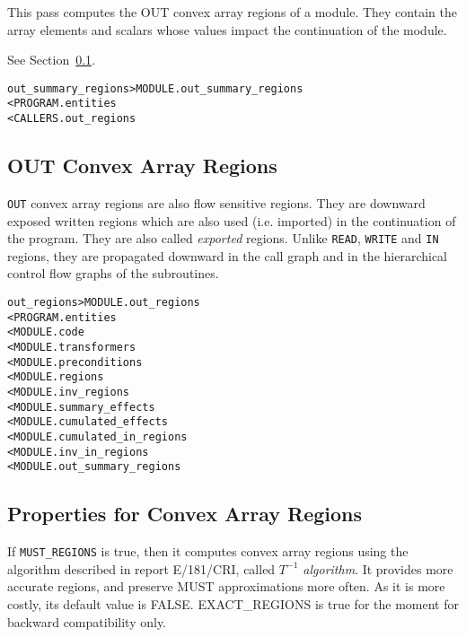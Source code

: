 \documentclass[a4paper]{report}
\newenvironment{PipsMake}{\begin{alltt}}{\end{alltt}}
\newenvironment{PipsPass}[1]{\label{pass:#1}}{}
\begin{document}
\begin{PipsPass}{out_summary_regions}
This pass computes the OUT convex array regions of a module. They
contain the array elements and scalars whose values impact the
continuation of the module.
\end{PipsPass}


See Section~\ref{subsubsection-out-regions}.

\begin{PipsMake}
out_summary_regions             > MODULE.out_summary_regions
        < PROGRAM.entities
        < CALLERS.out_regions
\end{PipsMake}


\subsection{OUT Convex Array Regions}
\label{subsubsection-out-regions}

\verb+OUT+ convex array regions are also flow sensitive regions. They are downward
exposed written regions which are also used (i.e. imported) in the
continuation of the program. They are also called {\em exported\/} regions.
Unlike \verb+READ+, \verb+WRITE+ and \verb+IN+ regions, they are propagated
downward in the call graph and in the hierarchical control flow graphs of
the subroutines.

\begin{PipsMake}
out_regions                     > MODULE.out_regions
        < PROGRAM.entities
        < MODULE.code
        < MODULE.transformers
        < MODULE.preconditions
        < MODULE.regions
        < MODULE.inv_regions
        < MODULE.summary_effects
        < MODULE.cumulated_effects
        < MODULE.cumulated_in_regions
        < MODULE.inv_in_regions
        < MODULE.out_summary_regions
\end{PipsMake}

\subsection{Properties for Convex Array Regions}
\label{subsection-regions}

If {\tt MUST\_REGIONS} is true, then it computes convex array regions using the
algorithm described in report E/181/CRI, called {\em $T^{-1}$
algorithm}. It provides more accurate regions, and preserve MUST
approximations more often. As it is more costly, its default value
is FALSE. EXACT\_REGIONS is true for the moment for backward
compatibility only.
\end{document}
